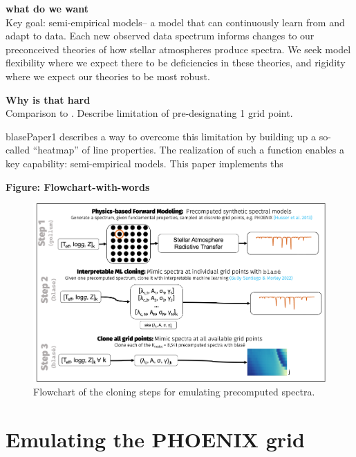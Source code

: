 \documentclass[twocolumn]{aastex631}
\begin{document}
\textbf{what do we want}\\
Key goal: semi-empirical models-- a model that can continuously learn from and adapt to data.  Each new observed data spectrum informs changes to our preconceived theories of how stellar atmospheres produce spectra.  We seek model flexibility where we expect there to be deficiencies in these theories, and rigidity where we expect our theories to be most robust.

\textbf{Why is that hard}\\



Comparison to \citet{czekala15}.  Describe limitation of pre-designating 1 grid point.




blasePaper1 describes a way to overcome this limitation by building up a so-called ``heatmap'' of line properties.  The realization of such a function enables a key capability: semi-empirical models.
This paper implements ths



\begin{mdframed}
    \textbf{Figure: Flowchart-with-words}
\end{mdframed}

\begin{figure}
    \includegraphics[width=\textwidth]{images/flowchart_frame1_v0p3.png}
    \caption{Flowchart of the cloning steps for emulating precomputed spectra.}
\end{figure}

\section{Emulating the PHOENIX grid}
\end{document}
